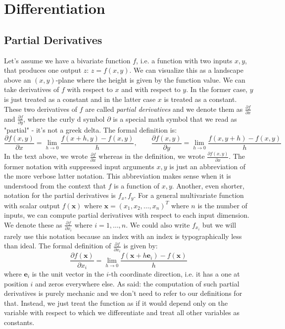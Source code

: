 \section{Differentiation}

\subsection{Partial Derivatives}
Let's assume we have a bivariate function $f$, i.e. a function with two inputs $x,y$, that produces one output $z$: $z = f(x,y)$. We can visualize this as a landscape above an $(x,y)$-plane where the height is given by the function value. We can take derivatives of $f$ with respect to $x$ and with respect to $y$. In the former case, $y$ is just treated as a constant and in the latter case $x$ is treated as a constant. These two derivatives of $f$ are called \emph{partial derivatives} and we denote them as $\frac{\partial f}{\partial x}$ and $\frac{\partial f}{\partial y}$, where the curly d symbol $\partial$ is a special math symbol that we read as "partial" - it's not a greek delta. The formal definition is:
\begin{equation}
 \frac{\partial f(x,y)}{\partial x} = \lim_{h \rightarrow 0} \frac{f(x+h,y) - f(x,y)}{h}, \qquad
 \frac{\partial f(x,y)}{\partial y} = \lim_{h \rightarrow 0} \frac{f(x,y+h) - f(x,y)}{h}
\end{equation}
In the text above, we wrote $\frac{\partial f}{\partial x}$ whereas in the definition, we wrote  $\frac{\partial f(x,y)}{\partial x}$. The former notation with suppressed input arguments $x,y$ is just an abbreviation of the more verbose latter notation. This abbreviation makes sense when it is understood from the context that $f$ is a function of $x,y$. Another, even shorter, notation for the partial derivatives is $f_x, f_y$. For a general multivariate function with scalar output $f(\mathbf{x})$ where $\mathbf{x} = (x_1,x_2,\ldots,x_n)^T$ where $n$ is the number of inputs, we can compute partial derivatives with respect to each input dimension. We denote these as $\frac{\partial f}{\partial x_i}$ where $i = 1,\ldots,n$. We could also write $f_{x_i}$ but we will rarely use this notation because an index with an index is typographically less than ideal. The formal definition of $\frac{\partial f}{\partial x_i}$ is given by:
\begin{equation}
 \frac{\partial f(\mathbf{x}) }{\partial x_i} 
 = \lim_{h \rightarrow 0} \frac{f(\mathbf{x} + h \mathbf{e}_i ) - f(\mathbf{x})}{h}
\end{equation}
where $\mathbf{e}_i$ is the unit vector in the $i$-th coordinate direction, i.e. it has a one at position $i$ and zeros everywhere else. As said: the computation of such partial derivatives is purely mechanic and we don't need to refer to our definitions for that. Instead, we just treat the function as if it would depend only on the variable with respect to which we differentiate and treat all other variables as constants.

